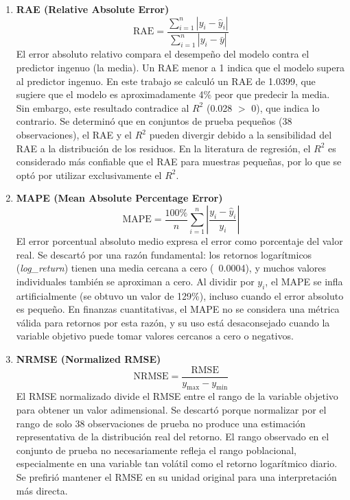 \documentclass[12pt,a4paper]{article}
\begin{document}
\begin{enumerate}[leftmargin=*,labelindent=0em,resume]

    \item \textbf{RAE (Relative Absolute Error)} \[
    \text{RAE} = \frac{\sum_{i=1}^{n}|y_i - \hat{y}_i|}{\sum_{i=1}^{n}|y_i - \bar{y}|}
    \]
    El error absoluto relativo compara el desempeño del modelo contra el predictor ingenuo (la media). Un RAE menor a 1 indica que el modelo supera al predictor ingenuo. En este trabajo se calculó un RAE de 1.0399, que sugiere que el modelo es aproximadamente 4\% peor que predecir la media. Sin embargo, este resultado contradice al $R^{2}$ (0.028 $>$ 0), que indica lo contrario. Se determinó que en conjuntos de prueba pequeños (38 observaciones), el RAE y el $R^{2}$ pueden divergir debido a la sensibilidad del RAE a la distribución de los residuos. En la literatura de regresión, el $R^{2}$ es considerado más confiable que el RAE para muestras pequeñas, por lo que se optó por utilizar exclusivamente el $R^{2}$.

    \item \textbf{MAPE (Mean Absolute Percentage Error)} \[
    \text{MAPE} = \frac{100\%}{n}\sum_{i=1}^{n}\left|\frac{y_i - \hat{y}_i}{y_i}\right|
    \]
    El error porcentual absoluto medio expresa el error como porcentaje del valor real. Se descartó por una razón fundamental: los retornos logarítmicos (\textit{log\_return}) tienen una media cercana a cero (~0.0004), y muchos valores individuales también se aproximan a cero. Al dividir por $y_i$, el MAPE se infla artificialmente (se obtuvo un valor de 129\%), incluso cuando el error absoluto es pequeño. En finanzas cuantitativas, el MAPE no se considera una métrica válida para retornos por esta razón, y su uso está desaconsejado cuando la variable objetivo puede tomar valores cercanos a cero o negativos.

    \item \textbf{NRMSE (Normalized RMSE)} \[
    \text{NRMSE} = \frac{\text{RMSE}}{y_{\max} - y_{\min}}
    \]
    El RMSE normalizado divide el RMSE entre el rango de la variable objetivo para obtener un valor adimensional. Se descartó porque normalizar por el rango de solo 38 observaciones de prueba no produce una estimación representativa de la distribución real del retorno. El rango observado en el conjunto de prueba no necesariamente refleja el rango poblacional, especialmente en una variable tan volátil como el retorno logarítmico diario. Se prefirió mantener el RMSE en su unidad original para una interpretación más directa.

\end{enumerate}
\end{document}
